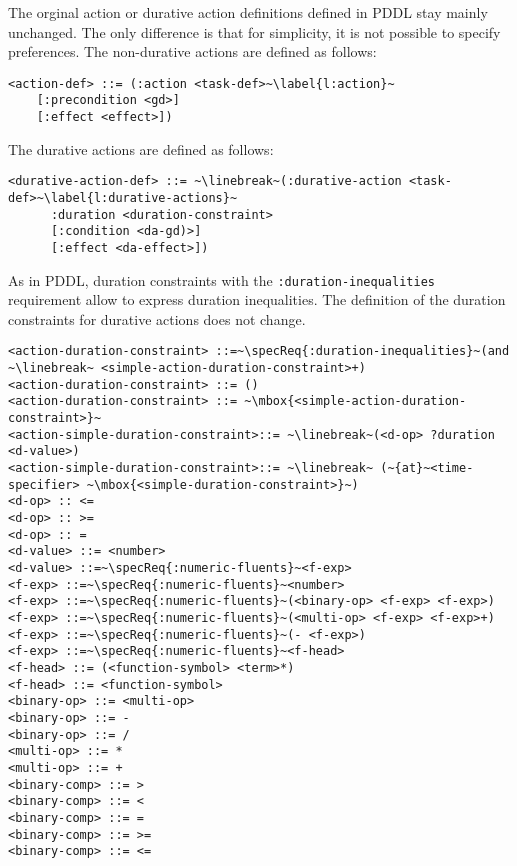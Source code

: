 \documentclass[letterpaper]{article} %
\begin{document}
%
%
The orginal action or durative action definitions defined in PDDL stay mainly unchanged. The only difference is that for simplicity, it is not possible to specify preferences. The non-durative actions are defined as follows:

\begin{lstlisting}[firstnumber=last, escapechar=~]
<action-def> ::= (:action <task-def>~\label{l:action}~
    [:precondition <gd>]
    [:effect <effect>])
\end{lstlisting}

%
%
\noindent The durative actions are defined as follows:

\begin{lstlisting}[firstnumber=last, escapechar=~]
<durative-action-def> ::= ~\linebreak~(:durative-action <task-def>~\label{l:durative-actions}~
      :duration <duration-constraint>
      [:condition <da-gd)>]
      [:effect <da-effect>])
\end{lstlisting}

%
%
As in PDDL, duration constraints with the \verb|:duration-inequalities| requirement allow to express duration inequalities. The definition of the duration constraints for durative actions does not change.

\begin{lstlisting}[firstnumber=last, escapechar=~]
<action-duration-constraint> ::=~\specReq{:duration-inequalities}~(and ~\linebreak~ <simple-action-duration-constraint>+)
<action-duration-constraint> ::= ()
<action-duration-constraint> ::= ~\mbox{<simple-action-duration-constraint>}~
<action-simple-duration-constraint>::= ~\linebreak~(<d-op> ?duration <d-value>)
<action-simple-duration-constraint>::= ~\linebreak~ (~{at}~<time-specifier> ~\mbox{<simple-duration-constraint>}~)
<d-op> :: <=
<d-op> :: >=
<d-op> :: =
<d-value> ::= <number>
<d-value> ::=~\specReq{:numeric-fluents}~<f-exp>
<f-exp> ::=~\specReq{:numeric-fluents}~<number>
<f-exp> ::=~\specReq{:numeric-fluents}~(<binary-op> <f-exp> <f-exp>)
<f-exp> ::=~\specReq{:numeric-fluents}~(<multi-op> <f-exp> <f-exp>+)
<f-exp> ::=~\specReq{:numeric-fluents}~(- <f-exp>)
<f-exp> ::=~\specReq{:numeric-fluents}~<f-head>
<f-head> ::= (<function-symbol> <term>*)
<f-head> ::= <function-symbol>
<binary-op> ::= <multi-op>
<binary-op> ::= -
<binary-op> ::= /
<multi-op> ::= *
<multi-op> ::= +
<binary-comp> ::= >
<binary-comp> ::= <
<binary-comp> ::= =
<binary-comp> ::= >=
<binary-comp> ::= <=
\end{lstlisting}
\end{document}

